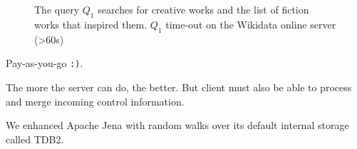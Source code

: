 
\section{\NAME}

 \begin{figure}[t]
  \begin{center}
 \end{center}
 \caption{The query $Q_1$ searches for creative works and the list of
  fiction works that inspired them. $Q_1$ time-out on
  the Wikidata online server (>60s)}
 \label{fig:q1}
\end{figure}


Pay-as-you-go \texttt{:)}.

The more the server can do, the better. But client must also be able
to process and merge incoming control information.

We enhanced Apache Jena with random walks over its default internal
storage called TDB2.


